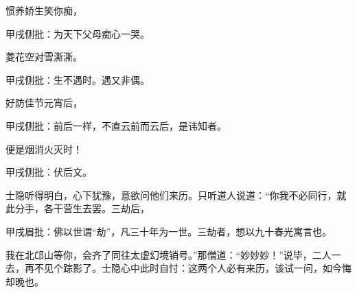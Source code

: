 \begin{poem}
    \begin{pl}惯养娇生笑你痴，\end{pl}\begin{note}甲戌侧批：为天下父母痴心一哭。\end{note}

    \begin{pl}菱花空对雪澌澌。\end{pl}\begin{note}甲戌侧批：生不遇时。遇又非偶。\end{note}

    \begin{pl}好防佳节元宵后，\end{pl}\begin{note}甲戌侧批：前后一样，不直云前而云后，是讳知者。\end{note}

    \begin{pl}便是烟消火灭时！\end{pl}\begin{note}甲戌侧批：伏后文。\end{note}
\end{poem}


\begin{parag}
    士隐听得明白，心下犹豫，意欲问他们来历。只听道人说道：“你我不必同行，就此分手，各干营生去罢。三劫后，\begin{note}甲戌眉批：佛以世谓“劫”，凡三十年为一世。三劫者，想以九十春光寓言也。\end{note}我在北邙山等你，会齐了同往太虚幻境销号。”那僧道：“妙妙妙！”说毕，二人一去，再不见个踪影了。士隐心中此时自忖：这两个人必有来历，该试一问，如今悔却晚也。
\end{parag}



